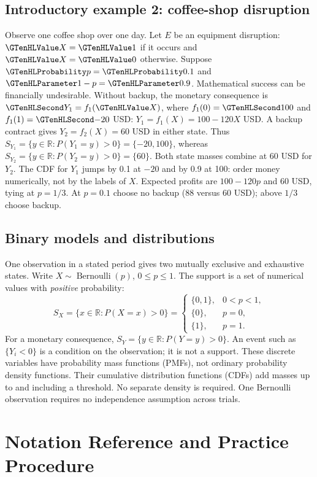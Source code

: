 \subsection{Introductory example 2: coffee-shop disruption}\label{ex:intro-two}
Observe one coffee shop over one day. Let $E$ be an equipment disruption:
$\Indicator{X}=\Indicator{1}$ if it occurs and $\Indicator{X}=\Indicator{0}$ otherwise.
Suppose $\SuccessProb{p}=\SuccessProb{0.1}$ and
$\FailureProb{1-p}=\FailureProb{0.9}$. Mathematical success can be financially undesirable.
Without backup, the monetary consequence is $\Money{Y_1}=f_1(\Indicator{X})$,
where $f_1(0)=\Money{100}$ and $f_1(1)=\Money{-20}$ USD:
$Y_1=f_1(X)=100-120X$ USD. A backup contract gives
$Y_2=f_2(X)=60$ USD in either state.
Thus $S_{Y_1}=\{y\in\mathbb R:P(Y_1=y)>0\}=\{-20,100\}$,
whereas $S_{Y_2}=\{y\in\mathbb R:P(Y_2=y)>0\}=\{60\}$.
Both state masses combine at 60 USD for $Y_2$.
The CDF for $Y_1$ jumps by 0.1 at $-20$ and by 0.9 at 100: order money
numerically, not by the labels of $X$.
Expected profits are $100-120p$ and 60 USD, tying at $p=1/3$.
At $p=0.1$ choose no backup (88 versus 60 USD); above $1/3$ choose backup.

\subsection{Binary models and distributions}
One observation in a stated period gives two mutually exclusive and exhaustive
states. Write $X\sim\operatorname{Bernoulli}(p)$, $0\leq p\leq1$.
The support is a set of numerical values with \emph{positive} probability:
\[
 S_X=\{x\in\mathbb R:P(X=x)>0\}
 =\begin{cases}\{0,1\},&0<p<1,\\\{0\},&p=0,\\\{1\},&p=1.\end{cases}
\]
For a monetary consequence, $S_Y=\{y\in\mathbb R:P(Y=y)>0\}$.
An event such as $\{Y_i<0\}$ is a condition on the observation; it is not a support.
These discrete variables have probability mass functions (PMFs), not ordinary
probability density functions. Their cumulative distribution functions (CDFs)
add masses up to and including a threshold. No separate density is required.
One Bernoulli observation requires no independence assumption across trials.

\clearpage\section{Notation Reference and Practice Procedure}\label{sec:t2-c3-notation}
